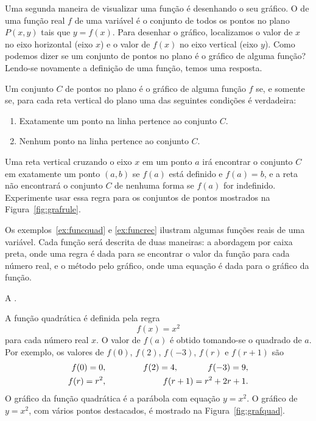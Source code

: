 \documentclass{svmono}
\begin{document}

Uma segunda maneira de visualizar uma função é desenhando o seu gráfico.
O  de uma função real $f$ de uma variável é o conjunto de
todos os pontos no plano $P(x,y)$ tais que $y = f(x)$. Para desenhar o
gráfico, localizamos o valor de $x$ no eixo horizontal (eixo $x$) e
o valor de $f(x)$ no eixo vertical (eixo $y$). Como podemos dizer se
um conjunto de pontos no plano é o gráfico de alguma função? Lendo-se
novamente a definição de uma função, temos uma resposta.

Um conjunto $C$ de pontos no plano é o gráfico de alguma função $f$ se,
e somente se, para cada reta vertical do plano uma das seguintes
condições é verdadeira:
\begin{enumerate}[(1)]
\item Exatamente um ponto na linha pertence ao conjunto $C$.
\item Nenhum ponto na linha pertence ao conjunto $C$.
\end{enumerate}

Uma reta vertical cruzando o eixo $x$ em um ponto $a$ irá encontrar
o conjunto $C$ em exatamente um ponto $(a,b)$ se $f(a)$ está definido
e $f(a) = b$, e a reta não encontrará o conjunto $C$ de nenhuma forma
se $f(a)$ for indefinido. Experimente usar essa regra para os conjuntos
de pontos mostrados na Figura~\ref{fig:grafrule}.


Os exemplos~\ref{ex:funcquad} e \ref{ex:funcrec} ilustram algumas funções
reais de uma variável. Cada função será
descrita de duas maneiras: a abordagem por caixa preta, onde uma regra é
dada para se encontrar o valor da função para cada número real, e o método
pelo gráfico, onde uma equação é dada para o gráfico da função.

\begin{example}\label{ex:funcquad}
A .

A função quadrática é definida pela regra
\[
  f(x) = x^2
\]
para cada número real $x$. O valor de $f(a)$ é obtido tomando-se o
quadrado de $a$. Por exemplo, os valores de $f(0)$, $f(2)$, $f(-3)$,
$f(r)$ e $f(r+1)$ são
\begin{eqnarray*}
   f(0) = 0, && \hspace{0.1\textwidth} f(2) = 4,
  \hspace{0.1\textwidth} f(-3) = 9,  \\
 f(r) = r^2, && \hspace{0.1\textwidth} f(r+1) = r^2 + 2r + 1.
\end{eqnarray*}
O gráfico da função quadrática é a parábola com equação $y = x^2$.
O gráfico de $y = x^2$, com vários pontos destacados, é mostrado
na Figura~\ref{fig:grafquad}.
\end{example}
\end{document}
